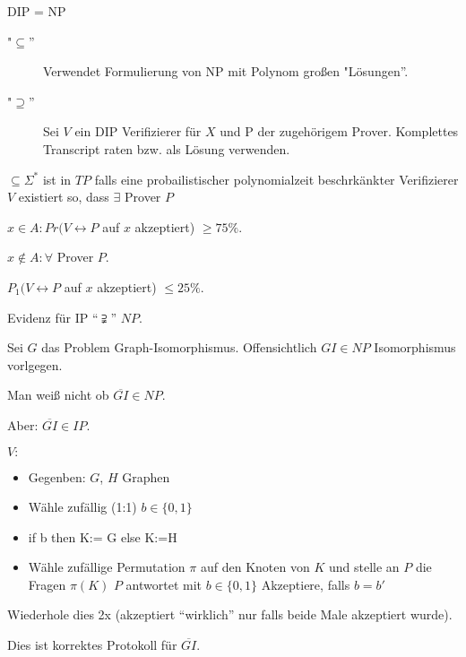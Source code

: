 \begin{satz}
DIP = NP

\begin{description}
\item["$\subseteq$''] Verwendet Formulierung von NP mit Polynom großen "Lösungen''.
\item["$\supseteq$''] Sei $V$ ein DIP Verifizierer für $X$ und P der
  zugehörigem Prover. Komplettes Transcript raten bzw. als Lösung
  verwenden.
\end{description}
\end{satz}

\begin{definition}
$ \subseteq \Sigma^*$ ist in $TP$
falls eine probailistischer polynomialzeit beschrkänkter Verifizierer $V$
existiert so, dass $\exists$ Prover $P$

$ x\in A : Pr(V \leftrightarrow P$ auf $x$ akzeptiert) $\geq 75\%$.

$ x \notin A : \forall$ Prover $P$.

$P_1 (V \leftrightarrow P$ auf $x$ akzeptiert) $\leq 25\%$.

Evidenz für IP ``$\supsetneqq$'' $NP$.

Sei $G$ das Problem Graph-Isomorphismus. Offensichtlich $GI \in NP$ Isomorphismus vorlgegen.

Man weiß nicht ob $\overline{GI} \in NP$.

Aber: $\overline{GI} \in IP$.

$V:$

\begin{itemize}
\item Gegenben: $G$,  $H$ Graphen
\item Wähle zufällig (1:1) $b\in \{0,1\}$
\item if b then K:= G else K:=H
\item Wähle zufällige Permutation $\pi$ auf den Knoten von $K$ und stelle an $P$ die Fragen $\pi(K)$ $P$ antwortet mit $b\in \{0,1\}$
Akzeptiere, falls $b=b'$
\end{itemize}

Wiederhole dies 2x (akzeptiert ``wirklich'' nur falls beide Male akzeptiert wurde).

Dies ist korrektes Protokoll für $\overline{GI}$.

\end{definition}









